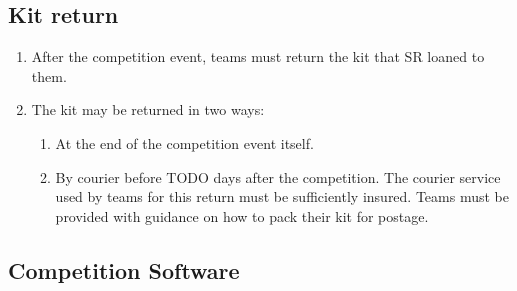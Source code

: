 \subsection{Kit return}
  \begin{enumerate}
  \item After the competition event, teams must return the kit that SR loaned to them.
  \item The kit may be returned in two ways:
    \begin{enumerate}
    \item At the end of the competition event itself.
    \item By courier before TODO days after the competition.  The courier service used by teams for this return must be sufficiently insured.  Teams must be provided with guidance on how to pack their kit for postage.
    \end{enumerate}
  \end{enumerate}


\subsection{Competition Software}

